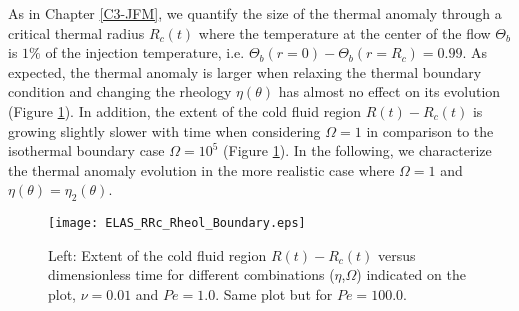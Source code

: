 As  in Chapter  \ref{C3-JFM},  we  quantify the  size  of the  thermal
anomaly  through   a  critical  thermal  radius   $R_c(t)$  where  the
temperature  at the  center of  the flow  $\Theta_b$ is  $1\%$ of  the
injection temperature,  i.e.  $\Theta_b(r=0)-\Theta_b(r=R_c)=0.99$. As
expected,  the thermal  anomaly is  larger when  relaxing the  thermal
boundary condition and changing the rheology $\eta(\theta)$ has almost
no        effect        on         its        evolution        (Figure
\ref{C4-ELAS_RRc_Rheol_Boundary}). In addition, the extent of the cold
fluid region $R(t)-R_c(t)$  is growing slightly slower  with time when
considering $\Omega=1$  in comparison to the  isothermal boundary case
$\Omega=10^5$   (Figure  \ref{C4-ELAS_RRc_Rheol_Boundary}).    In  the
following, we characterize  the thermal anomaly evolution  in the more
realistic case where $\Omega=1$ and $\eta(\theta)=\eta_2(\theta)$.

\begin{figure}[htpb]
  \begin{center}
    \graphicspath{ {/Users/thorey/Documents/These/Projet/Refroidissement/Skin_Model/Figure/Figure_Heating/} }
    \texttt{[image: ELAS\_RRc\_Rheol\_Boundary.eps]}
    \caption{Left:  Extent  of  the cold  fluid  region  $R(t)-R_c(t)$
      versus   dimensionless    time   for    different   combinations
      ($\eta$,$\Omega$)   indicated  on   the  plot,   $\nu=0.01$  and
      $Pe=1.0$. Same plot but for $Pe=100.0$.}
    \label{C4-ELAS_RRc_Rheol_Boundary}
  \end{center}
\end{figure}

